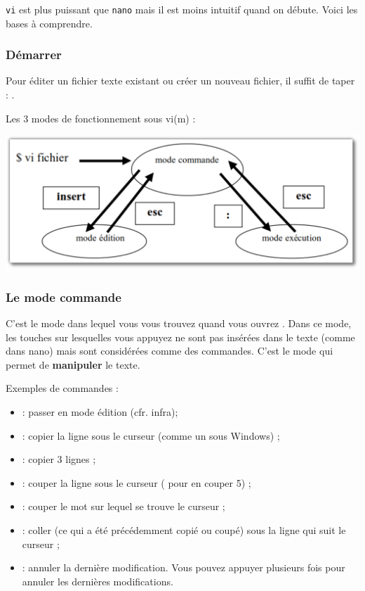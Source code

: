 \documentclass[a4paper,11pt]{style-esi/td}
\begin{document}
            \texttt{vi} est plus puissant que \texttt{nano}
            mais il est moins intuitif quand on débute.
            Voici les bases à comprendre.
    
            \subsubsection*{Démarrer}
    
                Pour éditer un fichier texte existant
                ou créer un nouveau fichier, 
                il suffit de taper : .
    
                Les 3 modes de fonctionnement sous vi(m) :
                \begin{center}
                \includegraphics[width=.7\textwidth]{image/vi.pdf}
                \end{center}
    
            \subsubsection*{Le mode commande}
    
                C'est le mode dans lequel vous vous trouvez quand vous ouvrez . 
                Dans ce mode, les touches sur lesquelles vous appuyez
                ne sont pas insérées dans le texte (comme dans nano)
                mais sont considérées comme des commandes.
                C'est le mode qui permet de \textbf{manipuler} le texte.
    
                Exemples de commandes :
                \begin{itemize}
                \item {} : passer en mode édition (cfr. infra);
                \item {} : copier la ligne sous le curseur (comme un  sous Windows) ; 
                \item {}	: copier 3 lignes ;
                \item {} : couper la ligne sous le curseur ( pour en couper 5) ;
                \item {} : couper le mot sur lequel se trouve le curseur ;
                \item {} : coller (ce qui a été précédemment copié ou coupé)
                    sous la ligne qui suit le curseur ;
                \item {} : annuler la dernière modification. 
                    Vous pouvez appuyer plusieurs fois pour annuler les dernières modifications.	
                \end{itemize}
    
\end{document}
